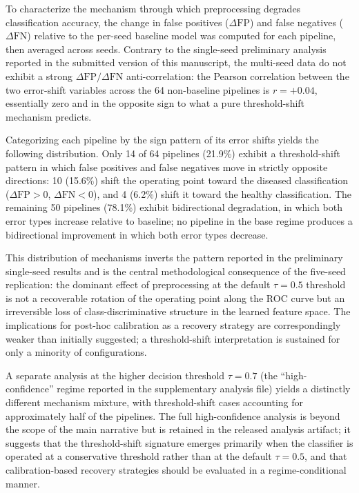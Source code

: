 \documentclass[preprint,5p,times,twocolumn]{elsarticle}
\begin{document}
To characterize the mechanism through which preprocessing degrades classification accuracy, the change in false positives ($\Delta\text{FP}$) and false negatives ($\Delta\text{FN}$) relative to the per-seed baseline model was computed for each pipeline, then averaged across seeds. Contrary to the single-seed preliminary analysis reported in the submitted version of this manuscript, the multi-seed data do not exhibit a strong $\Delta\text{FP}/\Delta\text{FN}$ anti-correlation: the Pearson correlation between the two error-shift variables across the 64 non-baseline pipelines is $r = +0.04$, essentially zero and in the opposite sign to what a pure threshold-shift mechanism predicts.

Categorizing each pipeline by the sign pattern of its error shifts yields the following distribution. Only 14 of 64 pipelines (21.9\%) exhibit a threshold-shift pattern in which false positives and false negatives move in strictly opposite directions: 10 (15.6\%) shift the operating point toward the diseased classification ($\Delta\text{FP} > 0$, $\Delta\text{FN} < 0$), and 4 (6.2\%) shift it toward the healthy classification. The remaining 50 pipelines (78.1\%) exhibit bidirectional degradation, in which both error types increase relative to baseline; no pipeline in the base regime produces a bidirectional improvement in which both error types decrease.

This distribution of mechanisms inverts the pattern reported in the preliminary single-seed results and is the central methodological consequence of the five-seed replication: the dominant effect of preprocessing at the default $\tau = 0.5$ threshold is not a recoverable rotation of the operating point along the ROC curve but an irreversible loss of class-discriminative structure in the learned feature space. The implications for post-hoc calibration as a recovery strategy are correspondingly weaker than initially suggested; a threshold-shift interpretation is sustained for only a minority of configurations.

A separate analysis at the higher decision threshold $\tau = 0.7$ (the ``high-confidence'' regime reported in the supplementary analysis file) yields a distinctly different mechanism mixture, with threshold-shift cases accounting for approximately half of the pipelines. The full high-confidence analysis is beyond the scope of the main narrative but is retained in the released analysis artifact; it suggests that the threshold-shift signature emerges primarily when the classifier is operated at a conservative threshold rather than at the default $\tau = 0.5$, and that calibration-based recovery strategies should be evaluated in a regime-conditional manner.
\end{document}

